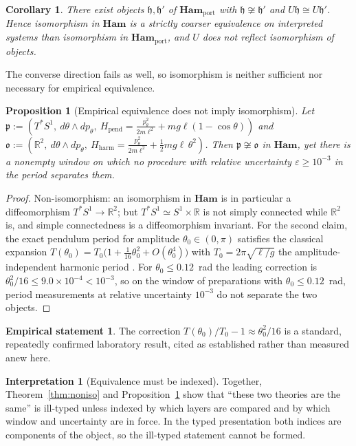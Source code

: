 \documentclass[10pt,a4paper]{article}
\theoremstyle{plain}
\newtheorem{proposition}[theorem]{Proposition}
\newtheorem{corollary}[theorem]{Corollary}
\theoremstyle{definition}
\newtheorem{interpretation}[theorem]{Interpretation}
\newtheorem{empirical}[theorem]{Empirical statement}
\newcommand{\Ham}{\mathbf{Ham}}
\newcommand{\HamP}{\mathbf{Ham}_{\mathrm{port}}}
\newcommand{\R}{\mathbb{R}}
\begin{document}
\begin{corollary}
\label{cor:notreflect}
There exist objects $\mathfrak{h},\mathfrak{h}'$ of $\HamP$ with $\mathfrak{h}\not\cong\mathfrak{h}'$ and $U\mathfrak{h}\cong U\mathfrak{h}'$. Hence isomorphism in $\Ham$ is a strictly coarser equivalence on interpreted systems than isomorphism in $\HamP$, and $U$ does not reflect isomorphism of objects.
\end{corollary}

The converse direction fails as well, so isomorphism is neither sufficient nor necessary for empirical equivalence.

\begin{proposition}[Empirical equivalence does not imply isomorphism]
\label{prop:nonnecessary}
Let $\mathfrak{p} := (T^*S^1,\ d\theta\wedge dp_\theta,\ H_{\mathrm{pend}} = \frac{p_\theta^2}{2m\ell^2} + mg\ell(1-\cos\theta))$ and $\mathfrak{o} := (\R^2,\ d\theta\wedge dp_\theta,\ H_{\mathrm{harm}} = \frac{p_\theta^2}{2m\ell^2} + \frac12 mg\ell\,\theta^2)$. Then $\mathfrak{p}\not\cong\mathfrak{o}$ in $\Ham$, yet there is a nonempty window on which no procedure with relative uncertainty $\varepsilon \geq 10^{-3}$ in the period separates them.
\end{proposition}
\begin{proof}
Non-isomorphism: an isomorphism in $\Ham$ is in particular a diffeomorphism $T^*S^1\to\R^2$; but $T^*S^1 \simeq S^1\times\R$ is not simply connected while $\R^2$ is, and simple connectedness is a diffeomorphism invariant. For the second claim, the exact pendulum period for amplitude $\theta_0 \in (0,\pi)$ satisfies the classical expansion $T(\theta_0) = T_0\big(1 + \tfrac{1}{16}\theta_0^2 + O(\theta_0^4)\big)$ with $T_0 = 2\pi\sqrt{\ell/g}$ the amplitude-independent harmonic period \cite[Ch.~4]{Arnold1989}. For $\theta_0 \le 0.12$~rad the leading correction is $\theta_0^2/16 \le 9.0\times10^{-4} < 10^{-3}$, so on the window of preparations with $\theta_0 \le 0.12$~rad, period measurements at relative uncertainty $10^{-3}$ do not separate the two objects.
\end{proof}

\begin{empirical}
\label{emp:pendulum}
The correction $T(\theta_0)/T_0 - 1 \approx \theta_0^2/16$ is a standard, repeatedly confirmed laboratory result, cited as established rather than measured anew here.
\end{empirical}

\begin{interpretation}[Equivalence must be indexed]
\label{int:equivalence}
Together, Theorem~\ref{thm:noniso} and Proposition~\ref{prop:nonnecessary} show that ``these two theories are the same'' is ill-typed unless indexed by which layers are compared and by which window and uncertainty are in force. In the typed presentation both indices are components of the object, so the ill-typed statement cannot be formed.
\end{interpretation}
\end{document}
